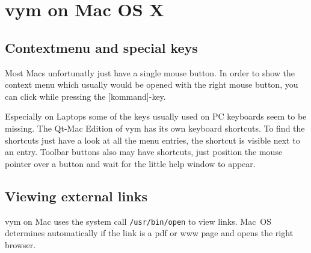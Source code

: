 \documentclass[12pt,a4paper]{article}
\newcommand{\vym}{{\sc vym }}
\newcommand{\key}[1]{[#1]}
\begin{document}
\section{\vym on Mac OS X}


    

\subsection {Contextmenu and special keys}
Most Macs unfortunatly just have a single mouse button. In order to show
the context menu which usually would be opened with the right mouse
button, you can click while pressing the \key{kommand}-key.

Especially on Laptops some of the keys usually used on PC keyboards seem
to be missing. The Qt-Mac Edition of \vym has its own keyboard
shortcuts. To find the shortcuts just have a look at all the menu
entries, the shortcut is visible next to an entry. Toolbar buttons also
may have shortcuts, just position the mouse pointer over a button and
wait for the little help window to appear. 

\subsection {Viewing external links}
\vym on Mac uses the system call {\tt /usr/bin/open} to view links.
Mac~OS determines automatically if the link is a pdf or www page and
opens the right browser.
\end{document}
